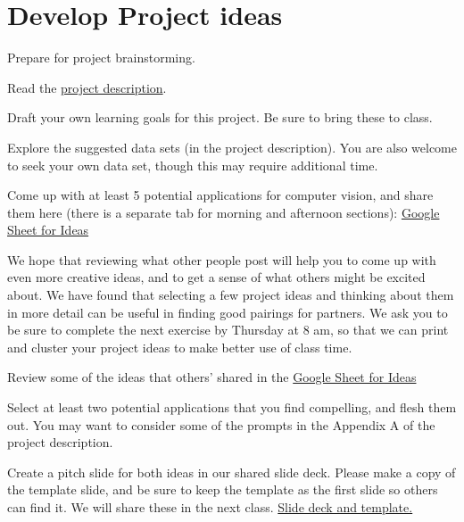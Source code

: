 \documentclass[assignment08_Solutions]{subfiles}
\begin{document}
\section{Develop Project ideas}

\begin{exercise}
Prepare for project brainstorming.
\bes
\item Read the \href{https://github.com/olincollege/MLfall2021/blob/master/Module\%201/m1_project/m1_project.pdf}{project description}.
\item Draft your own learning goals for this project. Be sure to bring these to class.
\item Explore the suggested data sets (in the project description). You are also welcome to seek your own data set, though this may require additional time.
\item Come up with at least 5 potential applications for computer vision, and share them here (there is a separate tab for morning and afternoon sections): \href{https://docs.google.com/spreadsheets/d/1TyzKsfdCvZEzfaYswfJSHiYH2JU73gd0KCIOwQijvFo/edit?usp=sharing}{Google Sheet for Ideas} 
\ees 
\end{exercise}
 
\vspace{1em}
We hope that reviewing what other people post will help you to come up with even more creative ideas, and to get a sense of what others might be excited about. We have found that selecting a few project ideas and thinking about them in more detail can be useful in finding good pairings for partners. We ask you to be sure to complete the next exercise by Thursday at 8 am, so that we can print and cluster your project ideas to make better use of class time.
\vspace{1em}
\begin{exercise}
\bes
\item Review some of the ideas that others' shared in the \href{https://docs.google.com/spreadsheets/d/1TyzKsfdCvZEzfaYswfJSHiYH2JU73gd0KCIOwQijvFo/edit?usp=sharing}{Google Sheet for Ideas} 
\item Select at least two potential applications that you find compelling, and flesh them out. You may want to consider some of the prompts in the Appendix A of the project description.
\item Create a pitch slide for both ideas in our shared slide deck. Please make a copy of the template slide, and be sure to keep the template as the first slide so others can find it. We will share these in the next class. \href{https://docs.google.com/presentation/d/1f3u9lJXV9_DzKRhHH41kr8h3xQn4ex6SbpcNwyws9z4/edit?usp=sharing}{Slide deck and template.} 
\ees
\end{exercise}
\end{document}
